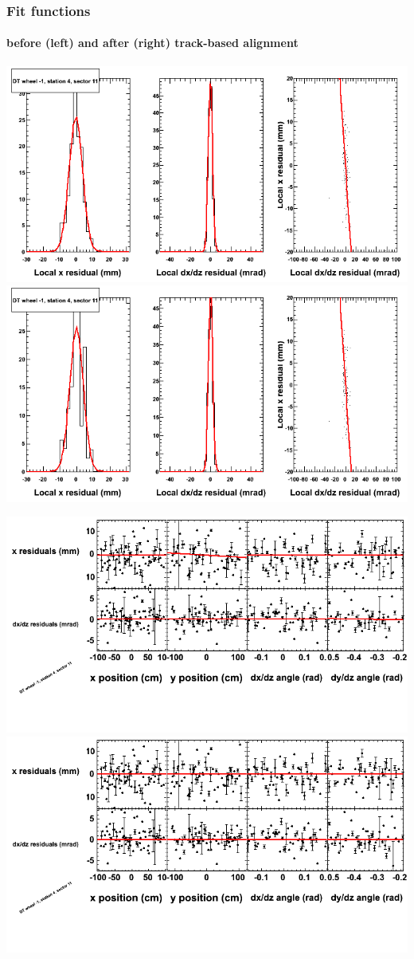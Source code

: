 \documentclass[compress]{beamer}
\begin{document}
\begin{frame}
\frametitle{Fit functions}
\framesubtitle{before (left) and after (right) track-based alignment}
\includegraphics[width=0.5\linewidth]{fitfunctions_re01/MBwhBst4sec11_bellcurves.png} \includegraphics[width=0.5\linewidth]{fitfunctions_re05/MBwhBst4sec11_bellcurves.png}

\includegraphics[width=0.5\linewidth]{fitfunctions_re01/MBwhBst4sec11_polynomials.png} \includegraphics[width=0.5\linewidth]{fitfunctions_re05/MBwhBst4sec11_polynomials.png}
\end{frame}
\end{document}
